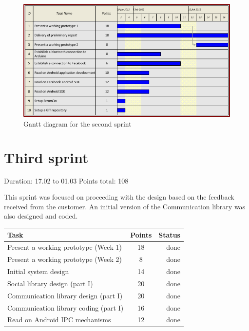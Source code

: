 \begin{figure}[h!]
\centering \includegraphics[scale=0.8]{img/sprints-gantt2.png}
\caption{Gantt diagram for the second sprint}
\label{fig:sprints-gantt2}
\end{figure}

\newpage

\section{Third sprint}

Duration: 17.02 to 01.03
Points total: 108

This sprint was focused on proceeding with the design based on the
feedback received from the customer. An initial version of the Communication
library was also designed and coded.

\begin{table}[ht!]
\begin{tabular}{ | l | c | r | }

\hline
\textbf{Task} & \textbf{Points} & \textbf{Status} \\
\hline

Present a working prototype (Week 1)		& 18 & done \\
\hline
Present a working prototype (Week 2)		& 8  & done \\
\hline
Initial system design				& 14 & done \\
\hline
Social library design (part I)			& 20 & done \\
\hline
Communication library design (part I)		& 20 & done \\
\hline
Communication library coding (part I) 		& 16 & done \\
\hline
Read on Android IPC mechanisms			& 12 & done \\
\hline

\end{tabular}
\end{table}

